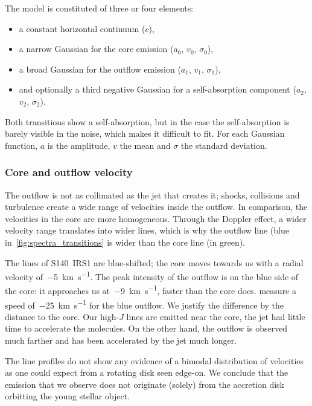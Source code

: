 The model is constituted of three or four elements:
\begin{itemize}
    \item a constant horizontal continuum ($c$),
    \item a narrow Gaussian for the core emission ($a_0$, $v_0$, $\sigma_0$),
    \item a broad Gaussian for the outflow emission ($a_1$, $v_1$, $\sigma_1$),
    \item and optionally a third negative Gaussian for a self-absorption component
     ($a_2$, $v_2$, $\sigma_2$).
\end{itemize}
Both transitions show a self-absorption, but in the case  the self-absorption is barely visible in the noise, which makes it difficult to fit.
For each Gaussian function, $a$ is the amplitude, $v$ the mean and $\sigma$ the standard deviation.

\subsubsection{Core and outflow velocity}
The outflow is not as collimated as the jet that creates it; shocks, collisions and turbulence create a wide range of velocities inside the outflow.
In comparison, the velocities in the core are more homogeneous.
Through the Doppler effect, a wider velocity range translates into wider lines, which is why the outflow line (blue in~\cref{fig:spectra_transitions} is wider than the core line (in green).

The  lines of S140~IRS1 are blue-shifted;
the core moves towards us with a radial velocity of~\SI{-5}{\kilo\meter\per\second}.
The peak intensity of the outflow is on the blue side of the core: it approaches us at~\SI{-9}{\kilo\meter\per\second}, faster than the core does.
\Textcite{maud2013s140} measure a speed of~\SI{-25}{\kilo\meter\per\second} for the blue  outflow.
We justify the difference by the distance to the core.
Our high-$J$ lines are emitted near the core, the jet had little time to accelerate the  molecules.
On the other hand, the  outflow is observed much farther and has been accelerated by the jet much longer.

The line profiles do not show any evidence of a bimodal distribution of velocities as one could expect from a rotating disk seen edge-on.
We conclude that the emission that we observe does not originate (solely) from the accretion disk orbitting the young stellar object.

